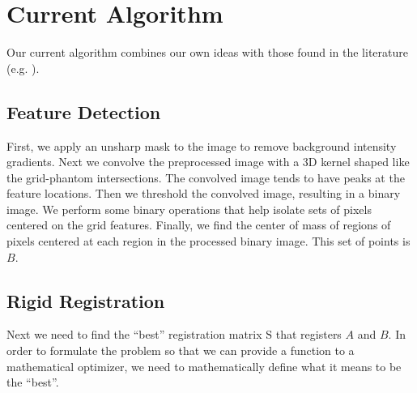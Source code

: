 \documentclass[12pt]{article}
\begin{document}
\section{Current Algorithm}

Our current algorithm combines our own ideas with those found in the literature (e.g. \cite{stanescu2010,baldwin2007}).  

\subsection{Feature Detection}

First, we apply an unsharp mask to the image to remove background intensity gradients.  Next we convolve the preprocessed image with a 3D kernel shaped like the grid-phantom intersections.  The convolved image tends to have peaks at the feature locations.  Then we threshold the convolved image, resulting in a binary image.  We perform some binary operations that help isolate sets of pixels centered on the grid features.  Finally, we find the center of mass of regions of pixels centered at each region in the processed binary image.  This set of points is $B$.

\subsection{Rigid Registration}

Next we need to find the ``best'' registration matrix $\textrm{S}$ that registers $A$ and $B$. In order to formulate the problem so that we can provide a function to a mathematical optimizer, we need to mathematically define what it means to be the ``best''.
\end{document}
